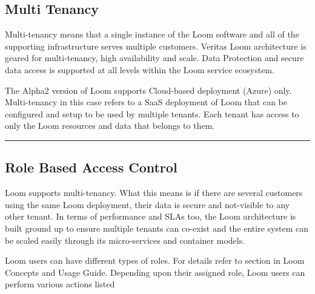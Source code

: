 \documentclass[letterpaper,10pt,english]{sphinxmanual}
\begin{document}
\subsection{Multi Tenancy}
\label{\detokenize{loom_getting_started_guide:multi-tenancy}}
Multi-tenancy means that a single instance of the Loom software and all of the supporting infrastructure serves multiple customers. Veritas Loom architecture is geared for multi-tenancy, high availability and scale. Data Protection and secure data access is supported at all levels within the Loom service ecosystem.

The Alpha2 version of Loom supports Cloud-based deployment (Azure) only.  Multi-tenancy in this case refers to a SaaS deployment of Loom that can be configured and setup to be used by multiple tenants.  Each tenant has access to only the Loom resources and data that belongs to them.


\bigskip\hrule\bigskip



\subsection{Role Based Access Control}
\label{\detokenize{loom_getting_started_guide:role-based-access-control}}
Loom supports multi-tenancy. What this means is if there are several customers using the same Loom deployment, their data is secure and not-visible to any other tenant.  In terms of performance and SLAs too, the Loom architecture is built ground up to ensure multiple tenants can co-exist and the entire system can be scaled easily through its micro-services and container models.

Loom users can have different types of roles.  For details refer to  section in Loom Concepts and Usage Guide. Depending upon their assigned role, Loom users can perform various actions listed {\hyperref[\detokenize{loom_getting_started_guide:content-tab-loom-user-actions}]{}}
\end{document}
